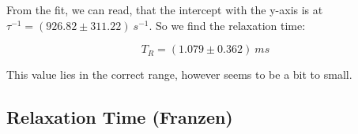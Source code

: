 From the fit, we can read, that the intercept with the y-axis is at $\tau^{-1} = (926.82 \pm 311.22)\ s^{-1}$. So we find the relaxation time:

$$\boxed{T_R = (1.079 \pm 0.362)\ ms}$$ 

This value lies in the correct range, however seems to be a bit to small.



\subsection{Relaxation Time (Franzen)}















